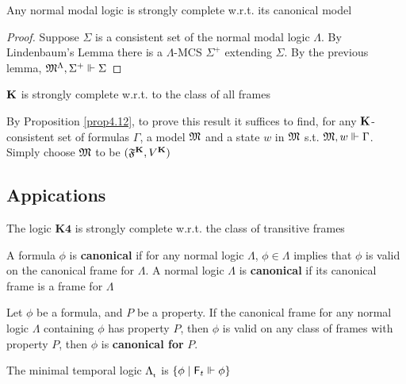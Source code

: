 \documentclass[11pt]{article}
\begin{document}
\begin{theorem}
Any normal modal logic is strongly complete w.r.t. its canonical model
\end{theorem}

\begin{proof}
Suppose \(\Sigma\) is a consistent set of the normal modal logic \(\Lambda\). By Lindenbaum's
Lemma there is a \(\Lambda\)-MCS \(\Sigma^+\) extending \(\Sigma\). By the previous lemma,
\(\mathfrak{M}^\Lambda,\Sigma^+\Vdash\Sigma\)
\end{proof}

\begin{theorem}[]
\(\operatorname{\textbf{K}}\) is strongly complete w.r.t. to the class of all frames
\end{theorem}

\begin{proposition}[]
By Proposition \ref{prop4.12}, to prove this result it suffices to find, for
any \(\operatorname{\textbf{K}}\)-consistent set of formulas \(\Gamma\), a model \(\mathfrak{M}\) and a state \(w\)
in \(\mathfrak{M}\) s.t. \(\mathfrak{M},w\Vdash\Gamma\). Simply choose \(\mathfrak{M}\) to be \((\mathfrak{F}^{\operatorname{\textbf{K}}},V^{\operatorname{\textbf{K}}})\)
\end{proposition}


\subsection{Appications}
\label{sec:org4f3f9c4}
\begin{theorem}[]
The logic \(\textbf{K4}\) is strongly complete w.r.t. the class of transitive frames
\end{theorem}

\begin{definition}[Canonicity]
A formula \(\phi\) is \textbf{canonical} if for any normal logic \(\Lambda\), \(\phi\in\Lambda\)
implies that \(\phi\) is valid on the canonical frame for \(\Lambda\). A normal logic \(\Lambda\) is
\textbf{canonical} if its canonical frame is a frame for \(\Lambda\)
\end{definition}

\begin{definition}
Let \(\phi\) be a formula, and \(P\) be a property. If the canonical frame for any
normal logic \(\Lambda\) containing \(\phi\) has property \(P\), then \(\phi\) is valid on any class
of frames with property \(P\), then \(\phi\) is \textbf{canonical for} \(P\).
\end{definition}

\begin{definition}[]
The minimal temporal logic \(\Lambda_{\sf_t}\) is \(\{\phi\mid \textsf{F}_t\Vdash\phi\}\)
\end{definition}
\end{document}
